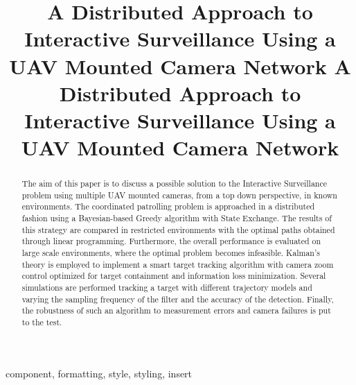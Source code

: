 \documentclass[conference]{IEEEtran}
\begin{document}
\title{A Distributed Approach to Interactive Surveillance Using a UAV Mounted Camera Network }


\author{
\and
{}
}

\maketitle

\title{A Distributed Approach to Interactive Surveillance Using a UAV Mounted Camera Network }

\begin{abstract}
The aim of this paper is to discuss a possible solution to the Interactive Surveillance problem using multiple UAV mounted cameras, from a top down perspective, in known environments. The coordinated patrolling problem is approached in a distributed fashion using a Bayesian-based Greedy algorithm with State Exchange. The results of this strategy are compared in restricted environments with the optimal paths obtained through linear programming. Furthermore, the overall performance is evaluated on large scale environments, where the optimal problem becomes infeasible. Kalman's theory is employed to implement a smart target tracking algorithm with camera zoom control optimized for target containment and information loss minimization. Several simulations are performed tracking a target with different trajectory models and varying the sampling frequency of the filter and the accuracy of the detection. Finally, the robustness of such an algorithm to measurement errors and camera failures is put to the test. \\
\end{abstract}

\begin{IEEEkeywords}
component, formatting, style, styling, insert
\end{IEEEkeywords}
\end{document}
